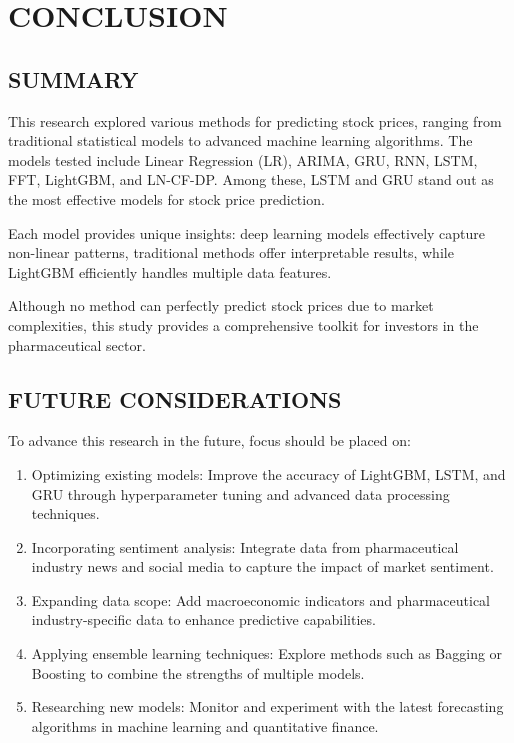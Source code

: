 \documentclass{ieeeojies}
\begin{document}
\section{CONCLUSION}

\subsection{SUMMARY}

This research explored various methods for predicting stock prices, ranging from traditional statistical models to advanced machine learning algorithms. The models tested include Linear Regression (LR), ARIMA, GRU, RNN, LSTM, FFT, LightGBM, and LN-CF-DP. Among these, LSTM and GRU stand out as the most effective models for stock price prediction.

Each model provides unique insights: deep learning models effectively capture non-linear patterns, traditional methods offer interpretable results, while LightGBM efficiently handles multiple data features.

Although no method can perfectly predict stock prices due to market complexities, this study provides a comprehensive toolkit for investors in the pharmaceutical sector.

\subsection{FUTURE CONSIDERATIONS}

To advance this research in the future, focus should be placed on:

\begin{enumerate}
    \item Optimizing existing models: Improve the accuracy of LightGBM, LSTM, and GRU through hyperparameter tuning and advanced data processing techniques.
    \item Incorporating sentiment analysis: Integrate data from pharmaceutical industry news and social media to capture the impact of market sentiment.
    \item Expanding data scope: Add macroeconomic indicators and pharmaceutical industry-specific data to enhance predictive capabilities.
    \item Applying ensemble learning techniques: Explore methods such as Bagging or Boosting to combine the strengths of multiple models.
    \item Researching new models: Monitor and experiment with the latest forecasting algorithms in machine learning and quantitative finance.
\end{enumerate}
\end{document}
